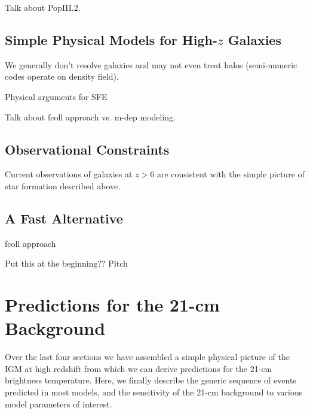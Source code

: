 Talk about PopIII.2.





\subsection{Simple Physical Models for High-$z$ Galaxies} \label{sec:galaxies}




We generally don't resolve galaxies and may not even treat halos (semi-numeric codes operate on density field).


Physical arguments for SFE

Talk about fcoll approach vs. m-dep modeling. 


\subsection{Observational Constraints}
Current observations of galaxies at $z > 6$ are consistent with the simple picture of star formation described above. 



\subsection{A Fast Alternative}
fcoll approach

{\color{red} Put this at the beginning?? Pitch}



\section{Predictions for the 21-cm Background} \label{sec:predictions}
Over the last four sections we have assembled a simple physical picture of the IGM at high redshift from which we can derive predictions for the 21-cm brightness temperature. Here, we finally describe the generic sequence of events predicted in most models, and the sensitivity of the 21-cm background to various model parameters of interest. 

